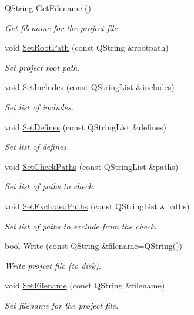 \begin{DoxyCompactItemize}
Q\-String \hyperlink{class_project_file_a1101263710071c7028ebc31c74516664}{Get\-Filename} ()
\begin{DoxyCompactList}\small\item\em Get filename for the project file. \end{DoxyCompactList}\item 
void \hyperlink{class_project_file_a30d42c900372ab0d2f71a2600154e9a9}{Set\-Root\-Path} (const Q\-String \&rootpath)
\begin{DoxyCompactList}\small\item\em Set project root path. \end{DoxyCompactList}\item 
void \hyperlink{class_project_file_aa4eea207fe45e9646b4801ad90d9b1a8}{Set\-Includes} (const Q\-String\-List \&includes)
\begin{DoxyCompactList}\small\item\em Set list of includes. \end{DoxyCompactList}\item 
void \hyperlink{class_project_file_a3b3b487125d11ae518ca7e6d6d775da7}{Set\-Defines} (const Q\-String\-List \&defines)
\begin{DoxyCompactList}\small\item\em Set list of defines. \end{DoxyCompactList}\item 
void \hyperlink{class_project_file_a8327d78e8c814b7a9002491c4c533eff}{Set\-Check\-Paths} (const Q\-String\-List \&paths)
\begin{DoxyCompactList}\small\item\em Set list of paths to check. \end{DoxyCompactList}\item 
void \hyperlink{class_project_file_a30c1866c5f86eca0de4b4fddbdcb761a}{Set\-Excluded\-Paths} (const Q\-String\-List \&paths)
\begin{DoxyCompactList}\small\item\em Set list of paths to exclude from the check. \end{DoxyCompactList}\item 
bool \hyperlink{class_project_file_a08e611ca440d47fa9e184d7acc89c41c}{Write} (const Q\-String \&filename=Q\-String())
\begin{DoxyCompactList}\small\item\em Write project file (to disk). \end{DoxyCompactList}\item 
void \hyperlink{class_project_file_af462360026c93df38c0e12baa2af4301}{Set\-Filename} (const Q\-String \&filename)
\begin{DoxyCompactList}\small\item\em Set filename for the project file. \end{DoxyCompactList}\end{DoxyCompactItemize}
